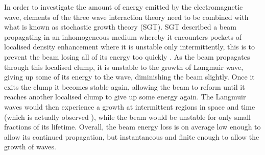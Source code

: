 %
%

In order to investigate the amount of energy emitted by the electromagnetic wave, elements of the three wave interaction theory need to be combined with what is known as stochastic growth theory \citep{robinson1993a}(SGT). 
SGT described a beam propagating in an inhomogeneous medium whereby it encounters pockets of localised density enhancement where it is unstable only intermittently, this is to prevent the beam losing all of its energy too quickly \citep{sturrock1964, ginzburg1958}. As the beam propagates through this localised clump, it is unstable to the growth of Langmuir wave, giving up some of its energy to the wave, diminishing the beam slightly. Once it exits the clump it becomes stable again, allowing the beam to reform until it reaches another localised clump to give up some energy again. The Langmuir waves would then experience a growth at intermittent regions in space and time (which is actually observed \citep{lin1986}), while the beam would be unstable for only small fractions of its lifetime. Overall, the beam energy loss is on average low enough to allow its continued propagation, but instantaneous and finite enough to allow the growth of waves. 
